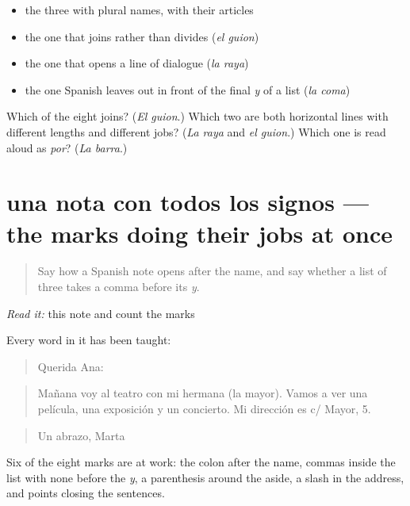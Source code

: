 \begin{itemize}
\raggedright
  \item the three with plural names, with their articles
  \item the one that joins rather than divides (\emph{el guion})
  \item the one that opens a line of dialogue (\emph{la raya})
  \item the one Spanish leaves out in front of the final \emph{y} of a list (\emph{la coma})
\end{itemize}

\begin{tcolorbox}[breakable,colback=teal!4,colframe=teal!35!black,title={Before you move on}]
Which of the eight joins? (\emph{El guion}.) Which two are both horizontal lines with different lengths and different jobs? (\emph{La raya} and \emph{el guion}.) Which one is read aloud as \emph{por}? (\emph{La barra}.)
\end{tcolorbox}
\section[una nota con todos los signos]{una nota con todos los signos — the marks doing their jobs at once}

\label{lesson:ES-C424-sintesis-nota}



\begin{quote}
Say how a Spanish note opens after the name, and say whether a list of three takes a comma before its \emph{y}.
\end{quote}

\begin{tcolorbox}[breakable,skin=enhanced,colback=orange!6,colframe=orange!45!black,boxrule=0.5pt,arc=1mm,left=6pt,right=6pt,top=4pt,bottom=4pt,fonttitle=\bfseries,title={Read this}]
\emph{Read it:} this note and count the marks

Every word in it has been taught:

\begin{quote}
Querida Ana:
\end{quote}

\begin{quote}
Mañana voy al teatro con mi hermana (la mayor). Vamos a ver una película, una exposición y un concierto. Mi dirección es c/ Mayor, 5.
\end{quote}

\begin{quote}
Un abrazo, Marta
\end{quote}

Six of the eight marks are at work: the colon after the name, commas inside the list with none before the \emph{y}, a parenthesis around the aside, a slash in the address, and points closing the sentences.
\end{tcolorbox}

